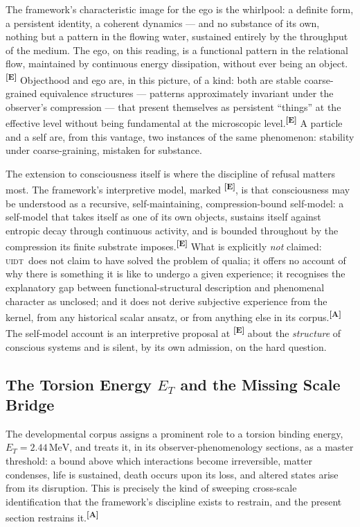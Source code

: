 \documentclass[12pt,a4paper,twoside]{article}
\theoremstyle{plain}
\theoremstyle{definition}
\theoremstyle{remark}
\newcommand{\UIDT}{\textsc{uidt}}
\newcommand{\MeV}{\,\mathrm{MeV}}
\newcommand{\catmark}[1]{\textsuperscript{\textsf{\textbf{[#1]}}}}
\newcommand{\ETorsion}{2.44\MeV} %
\begin{document}
The framework's characteristic image for the ego is the whirlpool: a
definite form, a persistent identity, a coherent dynamics --- and no
substance of its own, nothing but a pattern in the flowing water,
sustained entirely by the throughput of the medium. The ego, on this
reading, is a functional pattern in the relational flow, maintained by
continuous energy dissipation, without ever being an object.\catmark{E}
Objecthood and ego are, in this picture, of a kind: both are stable
coarse-grained equivalence structures --- patterns approximately
invariant under the observer's compression --- that present themselves
as persistent ``things'' at the effective level without being
fundamental at the microscopic level.\catmark{E} A particle and a self
are, from this vantage, two instances of the same phenomenon: stability
under coarse-graining, mistaken for substance.

The extension to consciousness itself is where the discipline of refusal
matters most. The framework's interpretive model, marked \catmark{E}, is
that consciousness may be understood as a recursive, self-maintaining,
compression-bound self-model: a self-model that takes itself as one of
its own objects, sustains itself against entropic decay through
continuous activity, and is bounded throughout by the compression its
finite substrate imposes.\catmark{E} What is explicitly \emph{not}
claimed: \UIDT\ does not claim to have solved the problem of qualia; it
offers no account of why there is something it is like to undergo a
given experience; it recognises the explanatory gap between
functional-structural description and phenomenal character as unclosed;
and it does not derive subjective experience from the kernel, from any
historical scalar ansatz, or from anything else in its corpus.\catmark{A}
The self-model account is an interpretive proposal at \catmark{E} about the
\emph{structure} of conscious systems
and is silent, by its own admission, on the hard question.

\subsection{The Torsion Energy \texorpdfstring{$E_T$}{E\_T} and the Missing Scale Bridge}
\label{subsec:et-scale-bridge}

The developmental corpus assigns a prominent role to a torsion binding
energy, $E_T = \ETorsion$, and treats it, in its observer-phenomenology
sections, as a master threshold: a bound above which interactions become
irreversible, matter condenses, life is sustained, death occurs upon its
loss, and altered states arise from its disruption. This is precisely
the kind of sweeping cross-scale identification that the framework's
discipline exists to restrain, and the present section restrains
it.\catmark{A}
\end{document}
